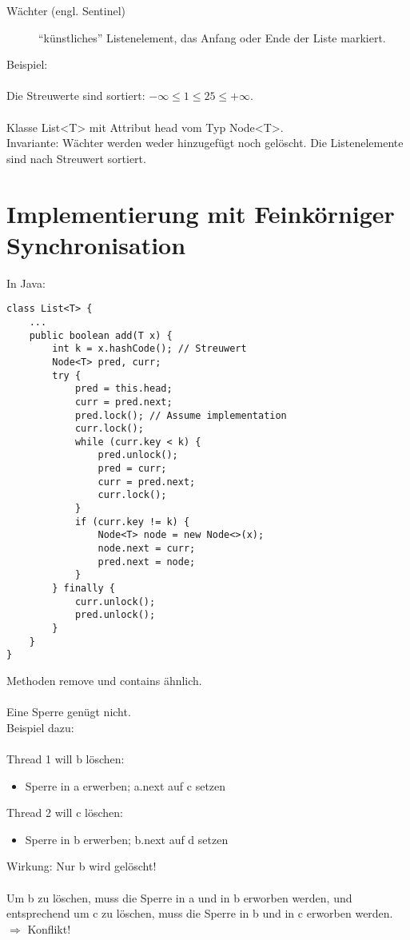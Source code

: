 \begin{description}
	\item[Wächter (engl. Sentinel)] "`künstliches"' Listenelement, das Anfang oder Ende der Liste markiert.
\end{description}

Beispiel:\\ %
\\
Die Streuwerte sind sortiert: $ -\infty \leq 1 \leq 25 \leq +\infty $.\\
\\
Klasse List<T> mit Attribut head vom Typ Node<T>.\\
Invariante: Wächter werden weder hinzugefügt noch gelöscht. Die Listenelemente sind nach Streuwert sortiert.

\section{Implementierung mit Feinkörniger Synchronisation}
In Java:
\begin{lstlisting}
class List<T> {
	...
	public boolean add(T x) {
		int k = x.hashCode(); // Streuwert
		Node<T> pred, curr;
		try {
			pred = this.head;
			curr = pred.next;
			pred.lock(); // Assume implementation
			curr.lock();
			while (curr.key < k) {
				pred.unlock();
				pred = curr;
				curr = pred.next;
				curr.lock();
			}
			if (curr.key != k) {
				Node<T> node = new Node<>(x);
				node.next = curr;
				pred.next = node;
			}
		} finally {
			curr.unlock();
			pred.unlock();
		}
	}
}
\end{lstlisting}

Methoden remove und contains ähnlich.\\
\\
Eine Sperre genügt nicht.\\
Beispiel dazu:\\%
\\
Thread 1 will b löschen:
\begin{itemize}
	\item Sperre in a erwerben; a.next auf c setzen
\end{itemize}
Thread 2 will c löschen:
\begin{itemize}
	\item Sperre in b erwerben; b.next auf d setzen
\end{itemize}
Wirkung: Nur b wird gelöscht!\\
\\
Um b zu löschen, muss die Sperre in a und in b erworben werden, und entsprechend um c zu löschen, muss die Sperre in b und in c erworben werden. $\Rightarrow$ Konflikt!

